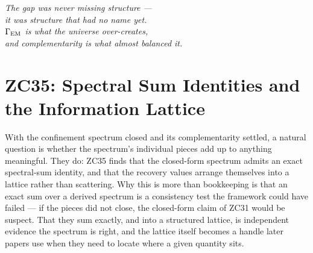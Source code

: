 \documentclass[12pt, a4paper]{article}
\begin{document}
\bigskip
\begin{center}
\textit{The gap was never missing structure ---\\
it was structure that had no name yet.\\
$\Gamma_{\rm EM}$ is what the universe over-creates,\\
and complementarity is what almost balanced it.}
\end{center}


\section{ZC35: Spectral Sum Identities and the Information Lattice}
\label{sec:zc35-spectral-sum}

With the confinement spectrum closed and its complementarity settled, a natural
question is whether the spectrum's individual pieces add up to anything
meaningful. They do: ZC35 finds that the closed-form spectrum admits an exact
spectral-sum identity, and that the recovery values arrange themselves into a
lattice rather than scattering. Why this is more than bookkeeping is that an
exact sum over a derived spectrum is a consistency test the framework could have
failed --- if the pieces did not close, the closed-form claim of ZC31 would be
suspect. That they sum exactly, and into a structured lattice, is independent
evidence the spectrum is right, and the lattice itself becomes a handle later
papers use when they need to locate where a given quantity sits.


\end{document}
